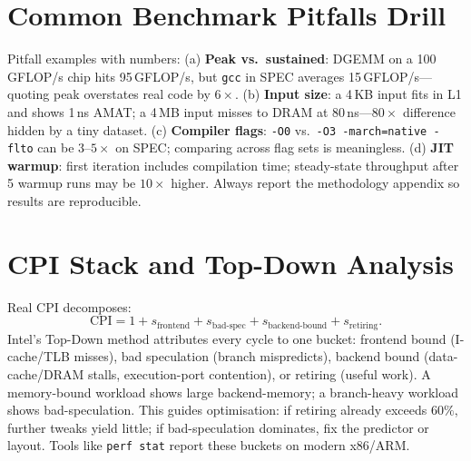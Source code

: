 \begin{center}
\end{center}

\section{Common Benchmark Pitfalls Drill}
Pitfall examples with numbers: (a) \textbf{Peak vs.\ sustained}: DGEMM on a
100\,GFLOP/s chip hits 95\,GFLOP/s, but \texttt{gcc} in SPEC averages
15\,GFLOP/s---quoting peak overstates real code by $6\times$. (b) \textbf{Input
size}: a 4\,KB input fits in L1 and shows 1\,ns AMAT; a 4\,MB input misses to
DRAM at 80\,ns---$80\times$ difference hidden by a tiny dataset. (c) \textbf{Compiler
flags}: \texttt{-O0} vs.\ \texttt{-O3 -march=native -flto} can be $3$--$5\times$
on SPEC; comparing across flag sets is meaningless. (d) \textbf{JIT warmup}:
first iteration includes compilation time; steady-state throughput after 5
warmup runs may be $10\times$ higher. Always report the methodology appendix
so results are reproducible.

\section{CPI Stack and Top-Down Analysis}
Real CPI decomposes:
\[ \text{CPI}=1 + s_{\text{frontend}} + s_{\text{bad-spec}} + s_{\text{backend-bound}} + s_{\text{retiring}}. \]
Intel's Top-Down method attributes every cycle to one bucket: frontend bound
(I-cache/TLB misses), bad speculation (branch mispredicts), backend bound
(data-cache/DRAM stalls, execution-port contention), or retiring (useful work).
A memory-bound workload shows large backend-memory; a branch-heavy workload
shows bad-speculation. This guides optimisation: if retiring already exceeds $60\%$,
further tweaks yield little; if bad-speculation dominates, fix the predictor
or layout. Tools like \texttt{perf stat} report these buckets on modern x86/ARM.

